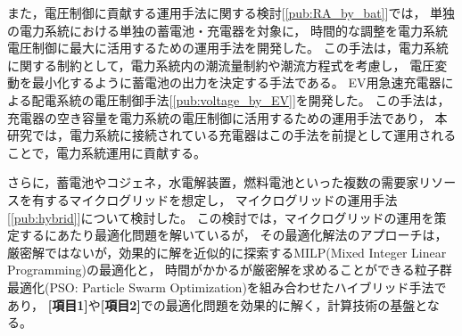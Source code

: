 \documentclass[11pt,a4paper,uplatex,dvipdfmx]{ujarticle} 		%
\newcommand{\研究課題名}{モビリティの時空間調整を活用した電力設備形成構築}
\newcommand{\研究機関名}{名古屋工業大学}
\newcommand{\研究代表者氏名}{中村勇太}
\newcommand{\研究期間の最終元号年度}{10}  %
\begin{document}
	また，電圧制御に貢献する運用手法に関する検討[\ref{pub:RA_by_bat}]では，
	単独の電力系統における単独の蓄電池・充電器を対象に，
	時間的な調整を電力系統電圧制御に最大に活用するための運用手法を開発した。
	この手法は，電力系統に関する制約として，電力系統内の潮流量制約や潮流方程式を考慮し，
	電圧変動を最小化するように蓄電池の出力を決定する手法である。
	EV用急速充電器による配電系統の電圧制御手法[\ref{pub:voltage_by_EV}]を開発した。
	この手法は，充電器の空き容量を電力系統の電圧制御に活用するための運用手法であり，
	本研究では，電力系統に接続されている充電器はこの手法を前提として運用されることで，電力系統運用に貢献する。

	さらに，蓄電池やコジェネ，水電解装置，燃料電池といった複数の需要家リソースを有するマイクログリッドを想定し，
	マイクログリッドの運用手法[\ref{pub:hybrid}]について検討した。
	この検討では，マイクログリッドの運用を策定するにあたり最適化問題を解いているが，
	その最適化解法のアプローチは，
	厳密解ではないが，効果的に解を近似的に探索するMILP(Mixed Integer Linear Programming)の最適化と，
	時間がかかるが厳密解を求めることができる粒子群最適化(PSO: Particle Swarm Optimization)を組み合わせたハイブリッド手法であり，
	\textbf{[項目1]}や\textbf{[項目2]}での最適化問題を効果的に解く，計算技術の基盤となる。
\end{document}
